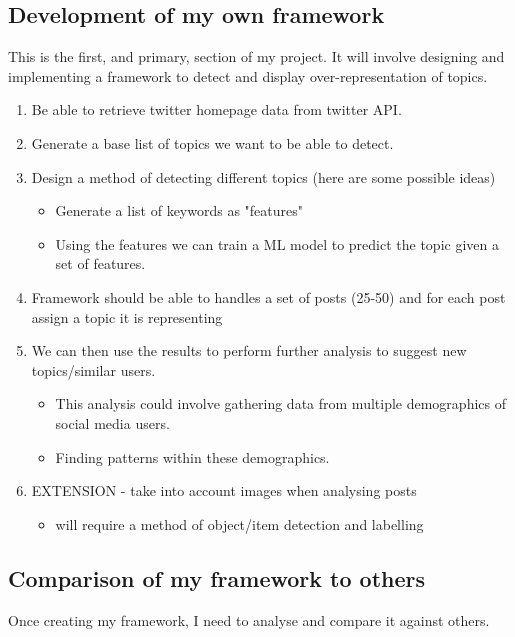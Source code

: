 \documentclass[a4paper,fleqn,10pt]{article}
\begin{document}
\subsection{Development of my own framework}
\label{subsec:framework}
This is the first, and primary, section of my project. It will involve designing and implementing a framework to detect and
display over-representation of topics.
\begin{enumerate}
    \item Be able to retrieve twitter homepage data from twitter API.
    \item Generate a base list of topics we want to be able to detect.
    \item Design a method of detecting different topics (here are some possible ideas)
    \begin{itemize}
        \item Generate a list of keywords as "features"
        \item Using the features we can train a ML model to predict the topic given a set of features.
    \end{itemize}
    \item Framework should be able to handles a set of posts (25-50) and for each post assign a topic it is representing
    \item We can then use the results to perform further analysis to suggest new topics/similar users.
    \begin{itemize}
        \item This analysis could involve gathering data from multiple demographics of social media users.
        \item Finding patterns within these demographics.
    \end{itemize}
    \item EXTENSION - take into account images when analysing posts
    \begin{itemize}
        \item will require a method of object/item detection and labelling
    \end{itemize}
\end{enumerate}

\subsection{Comparison of my framework to others}
Once creating my framework, I need to analyse and compare it against others.
\end{document}
